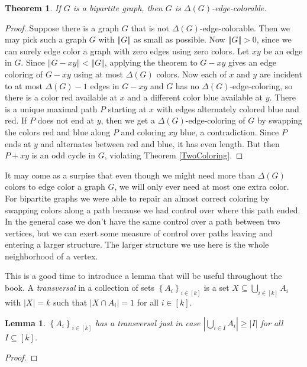 \documentclass{amsbook}
\theoremstyle{plain}
\newtheorem{lemma}{Lemma}
\newtheorem{theorem}{Theorem}
\numberwithin{equation}{chapter}
\newcommand{\set}[1]{\left\{ #1 \right\}}
\newcommand{\card}[1]{\left|#1\right|}
\newcommand{\size}[1]{\left\Vert#1\right\Vert}
\newcommand{\irange}[1]{\left[#1\right]}
\begin{document}
\begin{theorem}\label{DeltaEdgeColoring}
If $G$ is a bipartite graph, then $G$ is $\Delta(G)$-edge-colorable.
\end{theorem}
\begin{proof}
Suppose there is a graph $G$ that is not $\Delta(G)$-edge-colorable.  Then we may pick such a graph $G$ with $\size{G}$ as small as possible.
Now $\size{G} > 0$, since we can surely edge color a graph with zero edges using zero colors.  Let $xy$ be an edge in $G$.  Since $\size{G-xy} < \size{G}$,
applying the theorem to $G-xy$ gives an edge coloring of $G-xy$ using at most $\Delta(G)$ colors.  Now each of $x$ and $y$ are incident to at most $\Delta(G) - 1$ edges
in $G-xy$ and $G$ has no $\Delta(G)$-edge-coloring, so there is a color red available at $x$ and a different color blue available at $y$.  There is a unique maximal 
path $P$ starting at $x$ with edges alternately colored blue and red. If $P$ does not end at $y$, then we get a $\Delta(G)$-edge-coloring of $G$ by swapping the colors red and blue 
along $P$ and coloring $xy$ blue, a contradiction.  Since $P$ ends at $y$ and alternates between red and blue, it has even length.  But then $P + xy$ is an odd cycle in $G$, violating
Theorem \ref{TwoColoring}.
\end{proof}

It may come as a surpise that even though we might need more than $\Delta(G)$ colors to edge color a graph $G$, we will only ever need at most one extra color.
For bipartite graphs we were able to repair an almost correct coloring by swapping colors along a path because we had control over where this path ended.  In the
general case we don't have the same control over a path between two vertices, but we can exert some measure of control over paths leaving and entering a larger structure. 
The larger structure we use here is the whole neighborhood of a vertex.

This is a good time to introduce a lemma that will be useful throughout the book.  
A \emph{transversal} in a collection of sets $\set{A_i}_{i \in \irange{k}}$ is a set $X \subseteq \bigcup_{i \in \irange{k}} A_i$ with $\card{X} = k$ such that $\card{X \cap A_i} = 1$
for all $i \in \irange{k}$.
\begin{lemma}
$\set{A_i}_{i \in \irange{k}}$ has a transversal just in case $\card{\bigcup_{i \in I} A_i} \ge \card{I}$ for all $I \subseteq \irange{k}$.
\end{lemma}
\begin{proof}
\end{proof}
\end{document}
